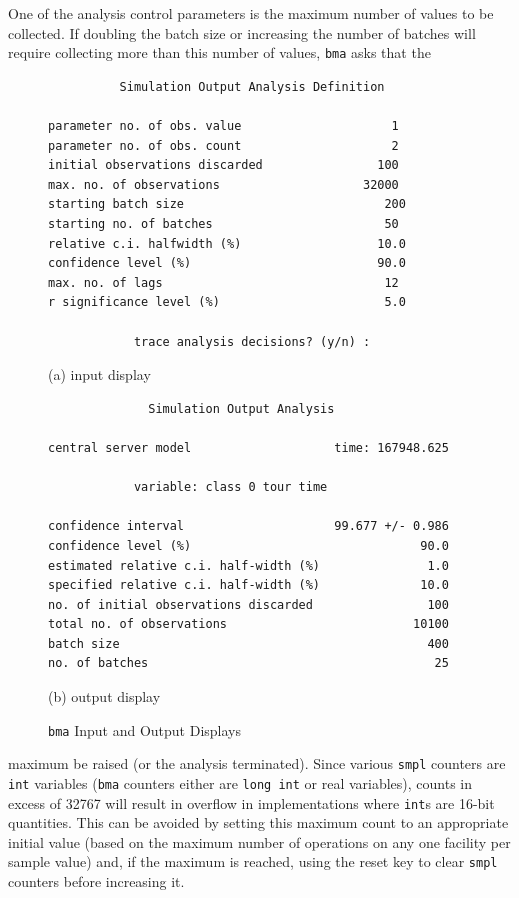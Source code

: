 One of the analysis control parameters is the maximum number of values
to be collected. If doubling the batch size or increasing the number of batches
will require collecting more than this number of values, \texttt{bma} asks that the


\begin{figure}[H]
\centering
\begin{minipage}{0.9\textwidth}
\small
\begin{verbatim}
          Simulation Output Analysis Definition

parameter no. of obs. value                     1
parameter no. of obs. count                     2
initial observations discarded                100
max. no. of observations                    32000
starting batch size                            200
starting no. of batches                        50
relative c.i. halfwidth (%)                   10.0
confidence level (%)                          90.0
max. no. of lags                               12
r significance level (%)                       5.0

            trace analysis decisions? (y/n) :
\end{verbatim}
\centering (a) input display
\end{minipage}

\bigskip
\begin{minipage}{0.9\textwidth}
\small
\begin{verbatim}
              Simulation Output Analysis

central server model                    time: 167948.625

            variable: class 0 tour time

confidence interval                     99.677 +/- 0.986
confidence level (%)                                90.0
estimated relative c.i. half-width (%)               1.0
specified relative c.i. half-width (%)              10.0
no. of initial observations discarded                100
total no. of observations                          10100
batch size                                           400
no. of batches                                        25
\end{verbatim}
\centering (b) output display
\end{minipage}
\caption{\texttt{bma} Input and Output Displays}
\label{fig:smpl-bma}
\end{figure}



\noindent maximum be raised (or the analysis terminated). Since various \texttt{smpl} counters
are \texttt{int} variables (\texttt{bma} counters either are \texttt{long int} or real variables),
counts in excess of 32767 will result in overflow in implementations where
\texttt{int}s are 16-bit quantities. This can be avoided by setting this maximum
count to an appropriate initial value (based on the maximum number of operations
on any one facility per sample value) and, if the maximum is reached,
using the reset key to clear \texttt{smpl} counters before increasing it.

